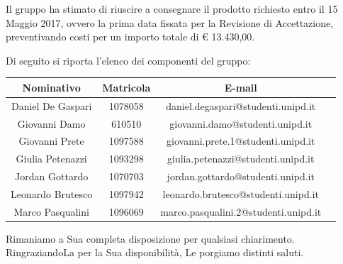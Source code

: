 \documentclass[a4paper,12pt]{letteracdp}
\begin{document}
\begin{letter}
	\noindent Il gruppo ha stimato di riuscire a consegnare il prodotto richiesto entro il 15 Maggio 2017, ovvero la prima data fissata per la Revisione di Accettazione, preventivando costi per un importo totale di \euro{} 13.430,00.

    \newpage

    \noindent Di seguito si riporta l'elenco dei componenti del gruppo:
    \vspace{0.8cm}
	\begin{center}
		\begin{tabular}{cccc}
			\toprule
			\textbf{Nominativo} & \textbf{Matricola} & \textbf{E-mail} \\
			\midrule
			Daniel De Gaspari 	& 1078058	& daniel.degaspari@studenti.unipd.it\\
			Giovanni Damo	& 610510	& giovanni.damo@studenti.unipd.it\\
			Giovanni Prete	& 1097588	& giovanni.prete.1@studenti.unipd.it \\
			Giulia	Petenazzi		& 1093298	& giulia.petenazzi@studenti.unipd.it \\
			Jordan Gottardo	& 1070703	& jordan.gottardo@studenti.unipd.it \\
			Leonardo Brutesco	& 1097942	& leonardo.brutesco@studenti.unipd.it\\
			Marco Pasqualini	& 1096069	&  marco.pasqualini.2@studenti.unipd.it \\
		    \bottomrule
		\end{tabular}
	\end{center}
    \vspace{0.8cm}
	\noindent Rimaniamo a Sua completa disposizione per qualsiasi chiarimento.\\
	RingraziandoLa per la Sua disponibilità, Le porgiamo distinti saluti.
    \closing{\mbox{}}

	\end{letter}
\end{document}
